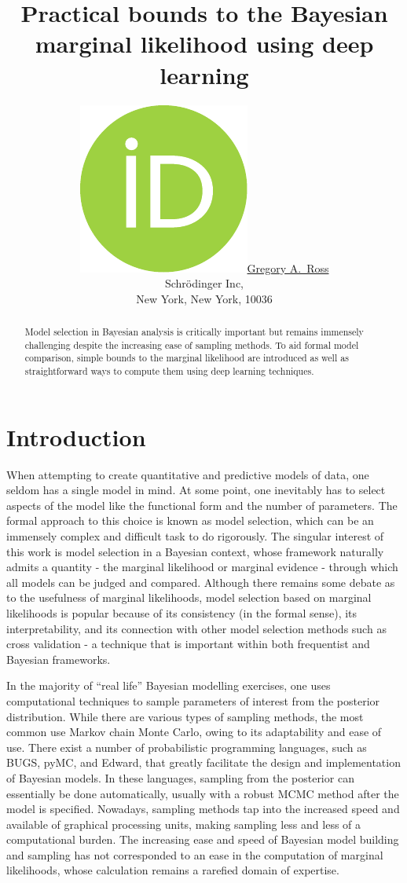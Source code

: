 \documentclass{article}
\title{Practical bounds to the Bayesian marginal likelihood using deep learning}
\author{ \href{https://orcid.org/0000-0000-0000-0000}{\includegraphics[scale=0.06]{orcid.pdf}\hspace{1mm}Gregory A.~Ross} \\
	Schr\"{o}dinger Inc,\\
	New York, New York, 10036\\
}
\begin{document}
\maketitle

\begin{abstract}
	Model selection in Bayesian analysis is critically important but remains immensely challenging despite the increasing ease of sampling methods. To aid formal model comparison, simple bounds to the marginal likelihood are introduced as well as straightforward ways to compute them using deep learning techniques. 
\end{abstract}




\section{Introduction}
When attempting to create quantitative and predictive models of data, one seldom has a single model in mind.
At some point, one inevitably has to select aspects of the model like the functional form and the number of parameters.
The formal approach to this choice is known as model selection, which can be an immensely complex and difficult task to do rigorously.
The singular interest of this work is model selection in a Bayesian context, whose framework naturally admits a quantity - the marginal likelihood or marginal evidence - through which all models can be judged and compared.
Although there remains some debate as to the usefulness of marginal likelihoods, model selection based on marginal likelihoods is popular because of its consistency (in the formal sense), its interpretability, and its connection with other model selection methods such as cross validation -  a technique that is important within both frequentist and Bayesian frameworks. 

In the majority of ``real life'' Bayesian modelling exercises, one uses computational techniques to sample parameters of interest from the posterior distribution. 
While there are various types of sampling methods, the most common use Markov chain Monte Carlo, owing to its adaptability and ease of use.
There exist a number of probabilistic programming languages, such as BUGS, pyMC, and Edward, that greatly facilitate the design and implementation of Bayesian models. 
In these languages, sampling from the posterior can essentially be done automatically, usually with a robust MCMC method after the model is specified. 
Nowadays, sampling methods tap into the increased speed and available of graphical processing units, making sampling less and less of a computational burden.
The increasing ease and speed of Bayesian model building and sampling has not corresponded to an ease in the computation of marginal likelihoods, whose calculation remains a rarefied domain of expertise. 
\end{document}
